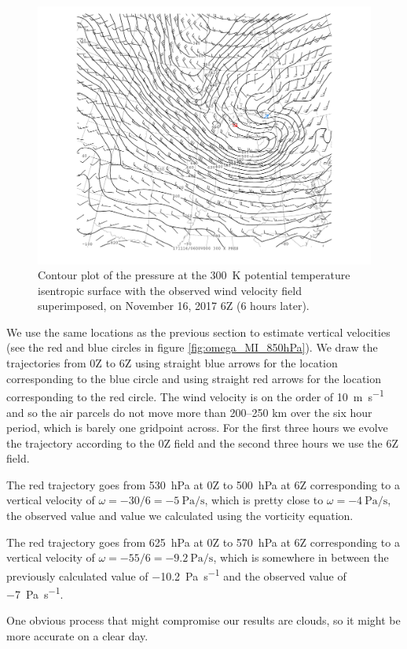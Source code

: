 \documentclass[11pt]{article}
\begin{document}
\begin{figure}[h!]
  \centering
  \includegraphics[width=\textwidth,trim={2.5cm 1cm 2.5cm 0},clip]{thta_pres_field_MI_6Z}
  \caption{Contour plot of the pressure at the \SI{300}{\K} potential temperature isentropic surface with the observed wind velocity field superimposed, on November 16, 2017 6Z (6 hours later).}
  \label{fig:thta_pres_field_MI_6Z}
\end{figure}

We use the same locations as the previous section to estimate vertical velocities (see the red and blue circles in figure \ref{fig:omega_MI_850hPa}). We draw the trajectories from 0Z to 6Z using straight blue arrows for the location corresponding to the blue circle and using straight red arrows for the location corresponding to the red circle. The wind velocity is on the order of \SI{10}{\m\per\s} and so the air parcels do not move more than 200--250 km over the six hour period, which is barely one gridpoint across. For the first three hours we evolve the trajectory according to the 0Z field and the second three hours we use the 6Z field.

The red trajectory goes from \SI{530}{\hecto\Pa} at 0Z to \SI{500}{\hecto\Pa} at 6Z corresponding to a vertical velocity of $\omega = -30/6 = \SI{-5}{\Pa\per\s}$, which is pretty close to $\omega = \SI{-4}{\Pa\per\s}$, the observed value and value we calculated using the vorticity equation.

The red trajectory goes from \SI{625}{\hecto\Pa} at 0Z to \SI{570}{\hecto\Pa} at 6Z corresponding to a vertical velocity of $\omega = -55/6 = \SI{-9.2}{\Pa\per\s}$, which is somewhere in between the previously calculated value of \SI{-10.2}{\Pa\per\s} and the observed value of \SI{-7}{\Pa\per\s}. 

One obvious process that might compromise our results are clouds, so it might be more accurate on a clear day.
\end{document}
